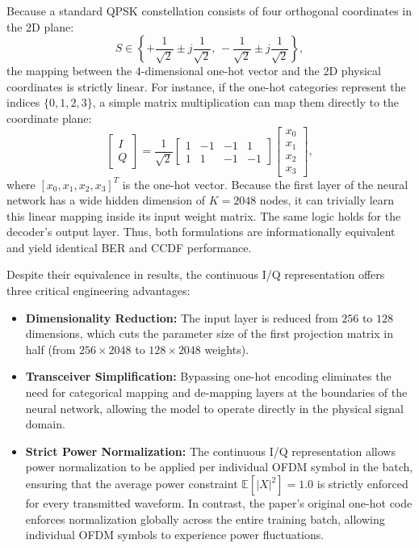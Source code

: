 \begin{keyinsight}
    Because a standard QPSK constellation consists of four orthogonal coordinates in the 2D plane:
    \begin{equation*}
        S \in \left\{ +\frac{1}{\sqrt{2}} \pm j \frac{1}{\sqrt{2}},\, -\frac{1}{\sqrt{2}} \pm j \frac{1}{\sqrt{2}} \right\},
    \end{equation*}
    the mapping between the $4$-dimensional one-hot vector and the 2D physical coordinates is strictly linear. For instance, if the one-hot categories represent the indices $\{0,1,2,3\}$, a simple matrix multiplication can map them directly to the coordinate plane:
    \begin{equation*}
        \begin{bmatrix} I \\ Q \end{bmatrix} = \frac{1}{\sqrt{2}}\begin{bmatrix} 1 & -1 & -1 & 1 \\ 1 & 1 & -1 & -1 \end{bmatrix} \begin{bmatrix} x_0 \\ x_1 \\ x_2 \\ x_3 \end{bmatrix},
    \end{equation*}
    where $[x_0, x_1, x_2, x_3]^T$ is the one-hot vector. Because the first layer of the neural network has a wide hidden dimension of $K=2048$ nodes, it can trivially learn this linear mapping inside its input weight matrix. The same logic holds for the decoder's output layer. Thus, both formulations are informationally equivalent and yield identical BER and CCDF performance.
\end{keyinsight}

Despite their equivalence in results, the continuous I/Q representation offers three critical engineering advantages:
\begin{itemize}
    \item \textbf{Dimensionality Reduction:} The input layer is reduced from $256$ to $128$ dimensions, which cuts the parameter size of the first projection matrix in half (from $256 \times 2048$ to $128 \times 2048$ weights).
    \item \textbf{Transceiver Simplification:} Bypassing one-hot encoding eliminates the need for categorical mapping and de-mapping layers at the boundaries of the neural network, allowing the model to operate directly in the physical signal domain.
    \item \textbf{Strict Power Normalization:} The continuous I/Q representation allows power normalization to be applied per individual OFDM symbol in the batch, ensuring that the average power constraint $\mathbb{E}[|X|^2] = 1.0$ is strictly enforced for every transmitted waveform. In contrast, the paper's original one-hot code enforces normalization globally across the entire training batch, allowing individual OFDM symbols to experience power fluctuations.
\end{itemize}

